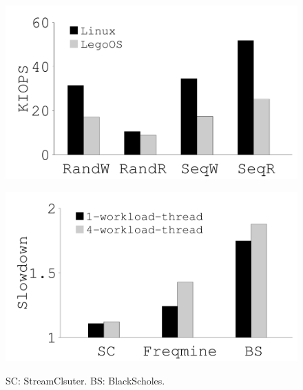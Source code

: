 {\begin{figure}[th]
\begin{minipage}{0.50\columnwidth}
\vspace{0.11in}
\begin{center}
\centerline{\includegraphics[width=1.0\columnwidth]{Figures/g_plot_LEGO_iops_storage.pdf}}
\vspace{-0.06in}
{
}
\end{center}
\end{minipage}
\begin{minipage}{0.50\columnwidth}
\vspace{0.11in}
\begin{center}
\centerline{\includegraphics[width=1.0\columnwidth]{Figures/g_plot_LEGO_parsec.pdf}}
\vspace{-0.06in}
{
SC: StreamClsuter. BS: BlackScholes.
}
\end{center}
\end{minipage}
\vspace{-0.1in}
\end{figure}
}
